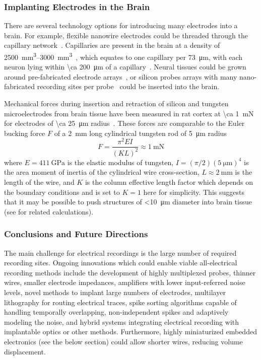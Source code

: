 \subsubsection{Implanting Electrodes in the Brain}

There are several technology options for introducing many electrodes into a brain.
For example, flexible nanowire electrodes could be threaded through the capillary network~\cite{llinas05}.
Capillaries are present in the brain at a density of \SIrange{2500}{3000}{\milli\meter\cubed}~\cite{schmidt89}, which equates to one capillary per \SI{73}{\micro\meter}, with each neuron lying within \SI{\ca 200}{\micro\meter} of a capillary~\cite{loffredo08}.
Neural tissues could be grown around pre-fabricated electrode arrays~\cite{jadhav12}, or silicon probes arrays with many nano-fabricated recording sites per probe~\cite{du11} could be inserted into the brain.

Mechanical forces during insertion and retraction of silicon and tungsten microelectrodes from brain tissue have been measured in rat cortex at \SI{\ca 1}{\milli\newton} for electrodes of \SI{\ca 25}{\micro\meter} radius~\cite{jensen03}.
These forces are comparable to the Euler bucking force $F$ of a \SI{2}{\milli\meter} long cylindrical tungsten rod of \SI{5}{\micro\meter} radius
\[F=\frac{\pi^2 E I}{(K L)^2} \approx \SI{1}{\milli\newton}\]
where $E=\SI{411}{\giga\pascal}$ is the elastic modulus of tungsten, $I=(\pi/2)(\SI{5}{\micro\meter})^4$ is the area moment of inertia of the cylindrical wire cross-section, $L\approx\SI{2}{\milli\meter}$ is the length of the wire, and $K$ is the column effective length factor which depends on the boundary conditions and is set to $K=1$ here for simplicity.
This suggests that it may be possible to push structures of \SI{<10}{\micro\meter} diameter into brain tissue (see \cite{najafi90} for related calculations).

\subsubsection{Conclusions and Future Directions}

The main challenge for electrical recordings is the large number of required recording sites.
Ongoing innovations which could enable viable all-electrical recording methods include
the development of highly multiplexed probes, thinner wires, smaller electrode impedances,
amplifiers with lower input-referred noise levels, novel methods to implant large numbers of electrodes,
multilayer lithography for routing electrical traces, spike sorting algorithms capable of handling temporally overlapping, non-independent spikes and adaptively modeling the noise, and hybrid systems integrating electrical recording with
implantable optics or other methods.
Furthermore, highly miniaturized embedded electronics (see the below section) could allow shorter wires, reducing volume displacement.

